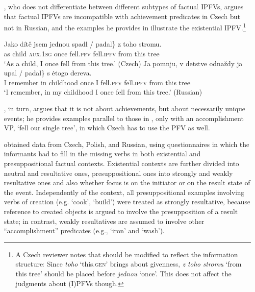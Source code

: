 \documentclass[output=paper,colorlinks,citecolor=brown]{langscibook}
\begin{document}
\citet{Dickey2000}, who does not differentiate between different subtypes of factual IPFVs, argues that factual IPFVs are incompatible with achievement predicates in Czech but not in Russian, and the examples he provides in  \citep[from][99 \& 101; my glosses and translations]{Dickey2000} illustrate the existential IPFV.\footnote{A Czech reviewer notes that  should be modified to reflect the information structure: Since \textit{toho} `this.\textsc{gen}' brings about givenness, \textit{z toho stromu} `from this tree' should be placed before \textit{jednou} `once'. This does not affect the judgments about (I)PFVs though.} 

\ea\label{ex:ofach}
\ea 
\gll Jako dítě jsem jednou \minsp{\{} spadl / \minsp{*} padal\} z toho stromu.\\
    as child \textsc{aux.1sg} once {} fell.\textsc{pfv} {} {} fell.\textsc{ipfv} from this tree\\
\glt `As a child, I once fell from this tree.' \hfill (Czech)\label{ex:ofacha}
\ex 
\gll Ja pomnju, v detstve odnaždy ja \minsp{\{} upal / padal\} s \.etogo dereva.\\
    I remember in childhood once I {} fell.\textsc{pfv} {} fell.\textsc{ipfv} from this tree\\
\glt `I remember, in my childhood I once fell from this tree.' \hfill (Russian)
\z 
\z 

\noindent \citet{Mueller-Reichau2018a}, in turn, argues that it is not about achievements, but about necessarily unique events; he provides examples parallel to those in , only with an accomplishment VP, `fell our single tree', in which Czech has to use the PFV as well.

\citet{klimek22} obtained data from Czech, Polish, and Russian, using questionnaires in which the informants had to fill in the missing verbs in both existential and presuppositional factual contexts. Existential contexts are further divided into neutral and resultative ones, presuppositional ones into strongly and weakly resultative ones and also whether focus is on the initiator or on the result state of the event. Independently of the context, all presuppositional examples involving verbs of creation (e.g. `cook', `build') were treated as strongly resultative, because reference to created objects is argued to involve the presupposition of a result state; in contrast, weakly resultatives are assumed to involve other ``accomplishment'' predicates (e.g., `iron' and `wash'). 
\end{document}
